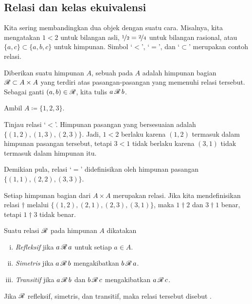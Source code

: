 \subsection{Relasi dan kelas ekuivalensi}

Kita sering membandingkan dua objek dengan suatu cara.  Misalnya, kita
mengatakan $1 < 2$ untuk bilangan asli,
$\nicefrac{1}{2} = \nicefrac{2}{4}$ untuk bilangan rasional, atau
$\{ a,c \} \subset \{ a,b,c \}$ untuk himpunan.  Simbol `$<$', `$=$', dan
`$\subset$' merupakan contoh
relasi.

\begin{defn}
Diberikan suatu himpunan $A$, sebuah \emph{}
pada $A$ adalah himpunan bagian ${\mathscr{R}} \subset A \times A$
yang terdiri atas pasangan-pasangan yang memenuhi relasi tersebut.
Sebagai ganti $(a,b) \in {\mathscr{R}}$, kita tulis
$a \, {\mathscr{R}} \, b$.
\end{defn}

\begin{example}
Ambil $A \coloneqq \{ 1,2,3 \}$.

Tinjau relasi `$<$'.  Himpunan pasangan yang bersesuaian adalah
$\bigl\{ (1,2), (1,3), (2,3) \bigr\}$.  Jadi, $1 < 2$ berlaku karena $(1,2)$
termasuk dalam himpunan pasangan tersebut, tetapi $3 < 1$ tidak berlaku karena
$(3,1)$ tidak termasuk dalam himpunan itu.

Demikian pula, relasi `$=$'
didefinisikan oleh himpunan pasangan $\bigl\{ (1,1), (2,2), (3,3) \big\}$.

Setiap himpunan bagian dari $A \times A$ merupakan relasi.  Jika kita
mendefinisikan relasi $\dagger$ melalui
$\bigl\{ (1,2), (2,1), (2,3), (3,1) \bigr\}$, maka $1 \dagger 2$ dan
$3 \dagger 1$ benar, tetapi $1 \dagger 3$ tidak benar.
\end{example}

\begin{defn}
\pagebreak[2]
Suatu relasi
${\mathscr{R}}$ pada himpunan $A$ dikatakan
\begin{enumerate}[(i)]
\item
\emph{Refleksif} jika $a\, {\mathscr{R}} \, a$ untuk
setiap $a \in A$.
\item
\emph{Simetris} jika $a\, {\mathscr{R}} \, b$ mengakibatkan
$b \, {\mathscr{R}} \, a$.
\item
\emph{Transitif} jika $a\, {\mathscr{R}} \, b$ dan
$b \, {\mathscr{R}} \, c$ mengakibatkan $a\, {\mathscr{R}} \, c$.
\end{enumerate}
Jika ${\mathscr{R}}$ refleksif, simetris, dan transitif, maka relasi tersebut disebut
\emph{}.
\end{defn}

